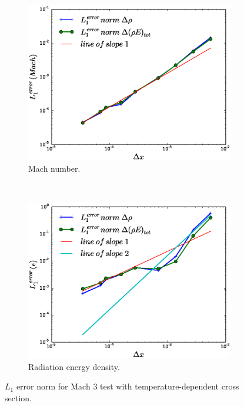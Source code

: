 \documentclass[times,doublespace]{fldauth}%
\begin{document}
\begin{figure}[ht]
    \begin{subfigure}{0.5\textwidth}
    \centering
    \includegraphics[width=\linewidth]{figures/dpt-xs/mass-energy-diff-scd-method-mach-number-convergence.eps}
    \caption{Mach number.}\label{fig:mach-3-dpt-xs-mach-conv}
    \end{subfigure}
    ~
    \begin{subfigure}{0.5\textwidth}
    \centering
    \includegraphics[width=\linewidth]{figures/dpt-xs/mass-energy-diff-scd-method-radiation-convergence.eps}
    \caption{Radiation energy density.}\label{fig:mach-3-dpt-xs-radiation-conv}
    \end{subfigure}        
\caption{$L_1$ error norm for Mach $3$ test with temperature-dependent cross section.}\label{fig:mach-3-dpt-xs-conv} 
\end{figure}
\end{document}
